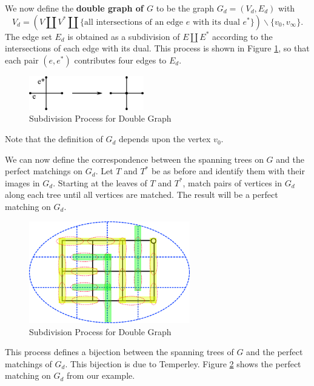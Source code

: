 \documentclass{article}
\begin{document}
\newpage
We now define the \textbf{double graph of $G$} to be the graph $G_d = (V_d, E_d)$ with 
$$
V_d =\left( V \amalg V^* \amalg \{\text{all intersections of an edge $e$ with its dual $e^*$}\} \right) \smallsetminus \{v_0 , v_\infty\}.
$$
The edge set $E_d$ is obtained as a subdivision of $E \amalg E^*$ according to the intersections of each edge with its dual. This process is shown in Figure \ref{fig:dblgraph}, so that each pair $(e,e^*)$ contributes four edges to $E_d$. 
\begin{figure}[htb!]
	\begin{center}
 	\includegraphics[width=5cm]{figures/grid_subdivid.png}
  	\caption{Subdivision Process for Double Graph}
	\label{fig:dblgraph}
 	 \end{center}
\end{figure}
Note that the definition of $G_d$ depends upon the vertex $v_0$. 

We can now define the correspondence between the spanning trees on $G$ and the perfect matchings on $G_d$. Let $T$ and $T^*$ be as before and identify them with their images in $G_d$. Starting at the leaves of $T$ and $T^*$, match pairs of vertices in $G_d$ along each tree until all vertices are matched. The result will be a perfect matching on $G_d$. 


\begin{figure}[htb!]
	\begin{center}
 	\includegraphics[width=7cm]{figures/grid_double_trees.png}
  	\caption{Subdivision Process for Double Graph}
	 \label{fig:dbltree}
 	 \end{center}
\end{figure}

This process defines a bijection between the spanning trees of $G$ and the perfect matchings of $G_d$. This bijection is due to Temperley. Figure \ref{fig:dbltree} shows the perfect matching on $G_d$ from our example.
	
	
	
	
	
	
\end{document}
